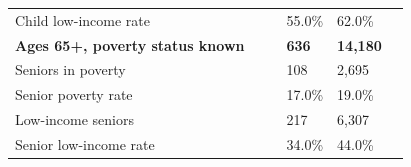 \documentclass[9pt]{report}
\begin{document}
\begin{tabular}{p{.10in}p{.10in}p{.10in}p{3.7in}>{\hfill}p{.85in}>{\hfill}p{.85in}>{\hfill}p{.85in}>{\hfill}p{.85in}p{0.1in}}
\multicolumn{4}{l}{\parbox{3.6in}{\strut\raggedright{{Child low-income rate}}\strut}} &  &  & 55.0\% & 62.0\% & \multicolumn{1}{l}{}  \\ 
\multicolumn{4}{l}{\parbox{3.5in}{\strut\raggedright{\textbf{Ages 65+, poverty status known}\strut}}} & \textbf{} & \textbf{} & \textbf{636} & \textbf{14,180} & \textbf{} \\ 
\multicolumn{4}{l}{\parbox{3.6in}{\strut\raggedright{{Seniors in poverty}}\strut}} &  &  & 108 & 2,695 & \multicolumn{1}{l}{}  \\ 
\multicolumn{4}{l}{\parbox{3.6in}{\strut\raggedright{{Senior poverty rate}}\strut}} &  &  & 17.0\% & 19.0\% & \multicolumn{1}{l}{}  \\ 
\multicolumn{4}{l}{\parbox{3.6in}{\strut\raggedright{{Low-income seniors}}\strut}} &  &  & 217 & 6,307 & \multicolumn{1}{l}{}  \\ 
\multicolumn{4}{l}{\parbox{3.6in}{\strut\raggedright{{Senior low-income rate}}\strut}} &  &  & 34.0\% & 44.0\% & \multicolumn{1}{l}{}  \\ 

\end{tabular}
\setlength{\tabcolsep}{6pt} %
\end{document}
